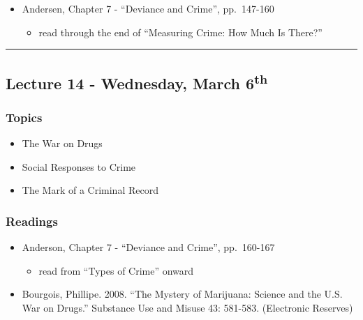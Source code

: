 \documentclass[]{book}
\providecommand{\tightlist}{%
  \setlength{\itemsep}{0pt}\setlength{\parskip}{0pt}}
\begin{document}
\begin{itemize}
\tightlist
\item
  Andersen, Chapter 7 - ``Deviance and Crime'', pp.~147-160

  \begin{itemize}
  \tightlist
  \item
    read through the end of ``Measuring Crime: How Much Is There?''
  \end{itemize}
\end{itemize}

\begin{center}\rule{0.5\linewidth}{\linethickness}\end{center}

\hypertarget{lecture-14---wednesday-march-6th}{%
\subsection*{\texorpdfstring{Lecture 14 - Wednesday, March 6\textsuperscript{th}}{Lecture 14 - Wednesday, March 6th}}\label{lecture-14---wednesday-march-6th}}

\hypertarget{topics-15}{%
\subsubsection*{Topics}\label{topics-15}}

\begin{itemize}
\tightlist
\item
  The War on Drugs
\item
  Social Responses to Crime
\item
  The Mark of a Criminal Record
\end{itemize}

\hypertarget{readings-14}{%
\subsubsection*{Readings}\label{readings-14}}

\begin{itemize}
\tightlist
\item
  Anderson, Chapter 7 - ``Deviance and Crime'', pp.~160-167

  \begin{itemize}
  \tightlist
  \item
    read from ``Types of Crime'' onward
  \end{itemize}
\item
  Bourgois, Phillipe. 2008. ``The Mystery of Marijuana: Science and the U.S. War on Drugs.'' Substance Use and Misuse 43: 581-583. (Electronic Reserves)
\end{itemize}
\end{document}
